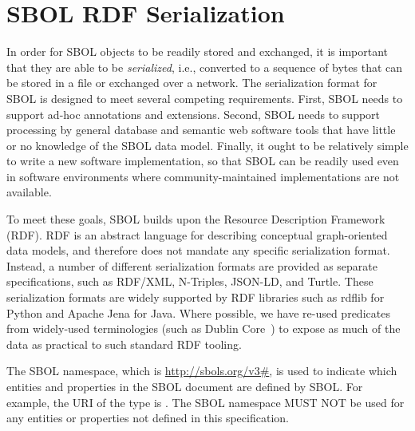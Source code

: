 \section{SBOL RDF Serialization}
\label{sec:serialization}

In order for SBOL objects to be readily stored and exchanged, it is important that they are able to be {\em serialized}, i.e., converted to a sequence of bytes that can be stored in a file or exchanged over a network.  The serialization format for SBOL is designed to meet several competing requirements. 
First, SBOL needs to support ad-hoc annotations and extensions. 
Second, SBOL needs to support processing by general database and semantic web software tools that have little or no knowledge of the SBOL data model. 
Finally, it ought to be relatively simple to write a new software implementation, so that SBOL can be readily used even in software environments where community-maintained implementations are not available.

To meet these goals, SBOL builds upon the Resource Description Framework (RDF).  RDF is an abstract language for describing conceptual graph-oriented data models, and therefore does not mandate any specific serialization format.  Instead, a number of different serialization formats are provided as separate specifications, such as RDF/XML, N-Triples, JSON-LD, and Turtle.  These serialization formats are widely supported by RDF libraries such as rdflib for Python and Apache Jena for Java.  Where possible, we have re-used predicates from widely-used terminologies (such as Dublin Core~\cite{dcmi2012}) to expose as much of the data as practical to such standard RDF tooling.

The SBOL namespace, which is \url{http://sbols.org/v3#}, is used to indicate which entities and properties in the SBOL document are defined by SBOL. For example, the URI of the type  is . The SBOL namespace MUST NOT be used for any entities or properties not defined in this specification.

